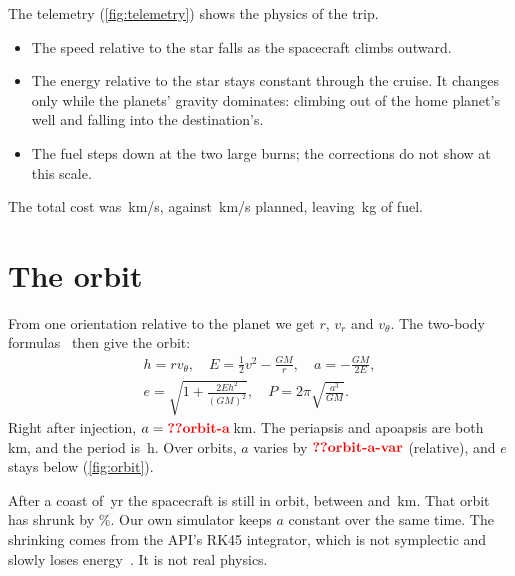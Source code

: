 \documentclass[aps,prd,twocolumn,nofootinbib,floatfix,superscriptaddress]{revtex4-2}
\begin{document}
The telemetry (\cref{fig:telemetry}) shows the physics of the trip.
\begin{itemize}
\item The speed relative to the star falls as the spacecraft climbs outward.
\item The energy relative to the star stays constant through the cruise. It changes only while the planets' gravity dominates: climbing out of the home planet's well and falling into the destination's.
\item The fuel steps down at the two large burns; the corrections do not show at this scale.
\end{itemize}
The total cost was \,km/s, against \,km/s planned, leaving \,kg of fuel.


\section{The orbit}\label{sec:orbit}
From one orientation relative to the planet we get $r$, $v_r$ and $v_\theta$.
The two-body formulas~\cite{ast2000notes} then give the orbit:
\begin{gather}
  h=rv_\theta,\quad E=\tfrac12v^2-\frac{GM}{r},\quad a=-\frac{GM}{2E},\nonumber\\
  e=\sqrt{1+\frac{2Eh^2}{(GM)^2}},\quad P=2\pi\sqrt{\frac{a^3}{GM}}.
\end{gather}
Right after injection, $a=\val{orbit-a}$\,km.
The periapsis and apoapsis are both \,km, and the period is \,h.
Over  orbits, $a$ varies by $\val{orbit-a-var}$ (relative), and $e$ stays below  (\cref{fig:orbit}).

After a coast of \,yr the spacecraft is still in orbit, between  and \,km.
That orbit has shrunk by \%.
Our own simulator keeps $a$ constant over the same time.
The shrinking comes from the API's RK45 integrator, which is not symplectic and slowly loses energy~\cite{hairer2006}.
It is not real physics.
\end{document}
